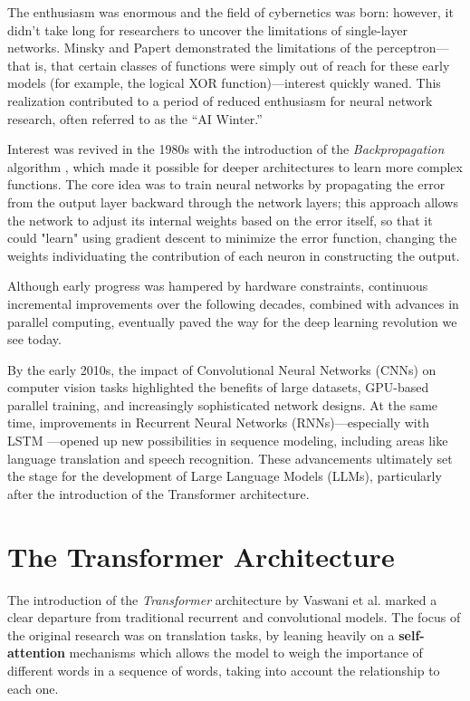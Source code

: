 The enthusiasm was enormous and the field of cybernetics was born: however, it didn’t take long for researchers to uncover the limitations of single-layer networks. Minsky and Papert demonstrated the limitations of the perceptron—that is, that certain classes of functions were simply out of reach for these early models (for example, the logical XOR function)—interest quickly waned. \cite{minsky1969perceptrons}
This realization contributed to a period of reduced enthusiasm for neural network research, often referred to as the “AI Winter.”

Interest was revived in the 1980s with the introduction of the \textit{Backpropagation} algorithm \cite{rumelhart1986learning}, which made it possible for deeper architectures to learn more complex functions. The core idea was to train neural networks by propagating the error from the output layer backward through the network layers; this approach allows the network to adjust its internal weights based on the error itself, so that it could "learn" using gradient descent to minimize the error function, changing the weights individuating the contribution of each neuron in constructing the output.

Although early progress was hampered by hardware constraints, continuous incremental improvements over the following decades, combined with advances in parallel computing, eventually paved the way for the deep learning revolution we see today. \cite{goodfellow2016deep}

By the early 2010s, the impact of Convolutional Neural Networks (CNNs) on computer vision tasks \cite{krizhevsky2012imagenet} highlighted the benefits of large datasets, GPU-based parallel training, and increasingly sophisticated network designs. At the same time, improvements in Recurrent Neural Networks (RNNs)—especially with LSTM \cite{hochreiter1997long}—opened up new possibilities in sequence modeling, including areas like language translation and speech recognition. These advancements ultimately set the stage for the development of Large Language Models (LLMs), particularly after the introduction of the Transformer architecture. \cite{vaswani2017attention}


\section{The Transformer Architecture}
\label{sec:transformer-architecture}

The introduction of the \textit{Transformer} architecture by Vaswani et al. \cite{vaswani2017attention} marked a clear departure from traditional recurrent and convolutional models. The focus of the original research was on translation tasks, by leaning heavily on a \textbf{self-attention} mechanisms which allows the model to weigh the importance of different words in a sequence of words, taking into account the relationship to each one.

